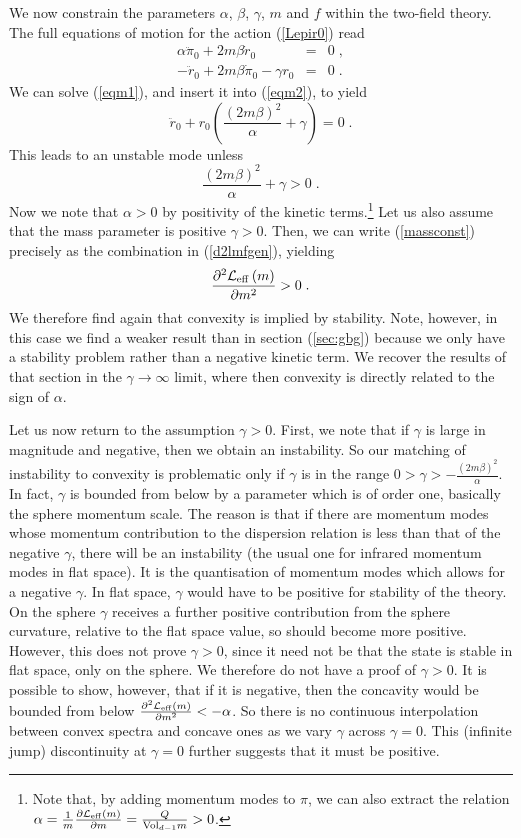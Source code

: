 \documentclass[11pt]{article}
\numberwithin{equation}{section}
\newcommand{\be}{\begin{equation}} \newcommand{\ee}{\end{equation}}
\newcommand{\bea}{\begin{eqnarray}}  \newcommand{\eea}{\end{eqnarray}}
\begin{document}
We now constrain the parameters $\alpha$, $\beta$, $\gamma$, $m$ and $f$ within the two-field theory. The full equations of motion for the action (\ref{Lepir0}) read
\bea
\alpha \ddot{\pi}_0 + 2 m \beta \dot{r}_0 &=& 0 \;, \label{eqm1}\\
-\ddot{r}_0 + 2m\beta \dot{\pi}_0 - \gamma r_0 &=& 0 \label{eqm2} \;.
\eea
We can solve (\ref{eqm1}), and insert it into (\ref{eqm2}), to yield 
\be
\ddot{r}_0 + r_0 \left( \frac{\left(2m\beta\right)^2}{\alpha}  + \gamma  \right) =0 \;.
\ee
This leads to an unstable mode unless 
\be
\frac{\left(2m\beta\right)^2}{\alpha}  + \gamma > 0 \;.
\label{massconst}
\ee
Now we note that $\alpha > 0$ by positivity of the kinetic terms.\footnote{Note that, by adding momentum modes to $\pi$, we can also extract the relation $\alpha =  \frac{1}{m}\frac{\partial{\cal L}_{\mathrm{eff}}\left(m\right)}{\partial m} = \frac{Q}{\mathrm{Vol}_{d-1}m}>0$.} Let us also assume that the mass parameter is positive $\gamma > 0$. Then, we can write (\ref{massconst}) precisely as the combination in (\ref{d2lmfgen}), yielding 
\be
\frac{\partial^2{\cal L}_{\mathrm{eff}}\left(m\right)}{\partial m^2} > 0 \;.
\ee
We therefore find again that convexity is implied by stability. Note, however, in this case we find a weaker result than in section (\ref{sec:gbg}) because we only have a stability problem rather than a negative kinetic term. We recover the results of that section in the $\gamma \rightarrow \infty$ limit, where then convexity is directly related to the sign of $\alpha$.

Let us now return to the assumption $\gamma >0$. First, we note that if $\gamma$ is large in magnitude and negative, then we obtain an instability. So our matching of instability to convexity is problematic only if $\gamma$ is in the range $0 >\gamma > -\frac{\left(2m\beta\right)^2}{\alpha}$. In fact, $\gamma$ is bounded from below by a parameter which is of order one, basically the sphere momentum scale. The reason is that if there are momentum modes whose momentum contribution to the dispersion relation is less than that of the negative $\gamma$, there will be an instability (the usual one for infrared momentum modes in flat space). It is the quantisation of momentum modes which allows for a negative $\gamma$. In flat space, $\gamma$ would have to be positive for stability of the theory. On the sphere $\gamma$ receives a further positive contribution from the sphere curvature, relative to the flat space value, so should become more positive. However, this does not prove $\gamma > 0$, since it need not be that the state is stable in flat space, only on the sphere. We therefore do not have a proof of $\gamma > 0$. It is possible to show, however, that if it is negative, then the concavity would be bounded from below $\frac{\partial^2{\cal L}_{\mathrm{eff}}\left(m\right)}{\partial m^2} < -\alpha$. So there is no continuous interpolation between convex spectra and concave ones as we vary $\gamma$ across $\gamma=0$. This (infinite jump) discontinuity at $\gamma=0$ further suggests that it must be positive. 
\end{document}
